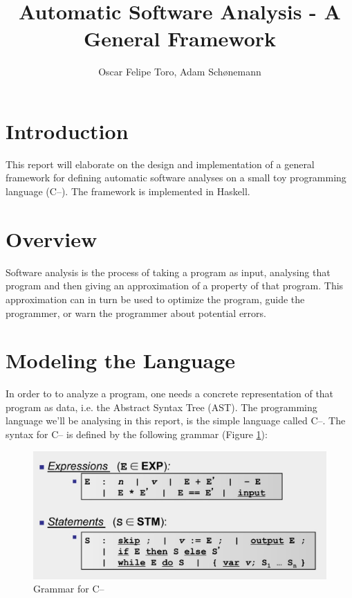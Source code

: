 \documentclass{article}
\title{Automatic Software Analysis - A General Framework}
\author{Oscar Felipe Toro, Adam Schønemann}
\date{}
\begin{document}
\maketitle

\section{Introduction}\label{introduction}

This report will elaborate on the design and implementation of a general
framework for defining automatic software analyses on a small
toy programming language (C--). The framework is implemented in Haskell.

\section{Overview}\label{overview}

Software analysis is the process of taking a program as input, analysing
that program and then giving an approximation of a property of that program.
This approximation can in turn be used to optimize the program, guide
the programmer, or warn the programmer about potential errors.

\section{Modeling the Language}\label{modeling-the-language}

In order to to analyze a program, one needs a concrete representation of
that program as data, i.e. the Abstract Syntax Tree (AST).
The programming language we'll be analysing in this report, is
the simple language called C--. The syntax for C-- is defined by the
following grammar (Figure \ref{cmm-grammar}):
\begin{figure}[H]
\centering
\includegraphics{./imgs/cmm.jpg}
\caption{Grammar for C--}
\label{cmm-grammar}
\end{figure}
\end{document}
